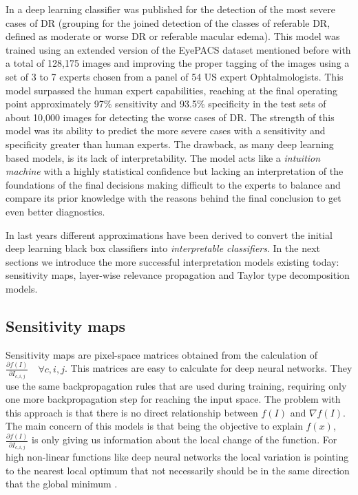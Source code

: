 \documentclass[preprint]{elsarticle}
\theoremstyle{definition} %
\theoremstyle{remark}
\begin{document}
In \citep{doi:10.1001/jama.2016.17216} a deep learning classifier was published for the detection of the most severe cases of DR (grouping for the joined detection of the classes of referable DR, defined as moderate or worse DR or referable macular edema). This model was trained using an extended version of the EyePACS dataset mentioned before with a total of 128,175 images and improving the proper tagging of the images using a set of 3 to 7 experts chosen from a panel of 54 US expert Ophtalmologists. This model surpassed the human expert capabilities, reaching at the final operating point approximately  97\% sensitivity and 93.5\% specificity in the test sets of about 10,000 images for detecting the worse cases of DR. The strength of this model was its ability to predict the more severe cases with a sensitivity and specificity greater than human experts. The drawback, as many deep learning based models, is its lack of interpretability. The model acts like a \emph{intuition machine} with a highly statistical confidence but lacking an interpretation of the foundations of the final decisions making difficult to the experts to balance and compare its prior knowledge with the reasons behind the final conclusion to get even better diagnostics.

In last years different approximations have been derived to convert the initial deep learning black box classifiers into \emph{interpretable classifiers}. In the next sections we introduce the more successful interpretation models existing today: sensitivity maps, layer-wise relevance propagation and Taylor type decomposition models. 

\subsection{Sensitivity maps}

Sensitivity maps \citep{DBLP:journals/corr/SimonyanVZ13} are pixel-space matrices obtained from the calculation of $ \frac{\partial f(I)}{\partial I_{c,i,j}} \quad \forall c,i,j$. This matrices are easy to calculate for deep neural networks. They use the same backpropagation rules that are used during training, requiring only one more backpropagation step for reaching the input space. The problem with this approach is that there is no direct relationship between $f(I)$ and $\nabla f(I)$. The main concern of this models is that being the objective to explain $f(x)$, $ \frac{\partial f(I)}{\partial I_{c,i,j}}$ is only giving us information about the local change of the function. For high non-linear functions like deep neural networks the local variation is pointing to the nearest local optimum that not necessarily should be in the same direction that the global minimum \cite{baehrens2010explain}.
\end{document}
